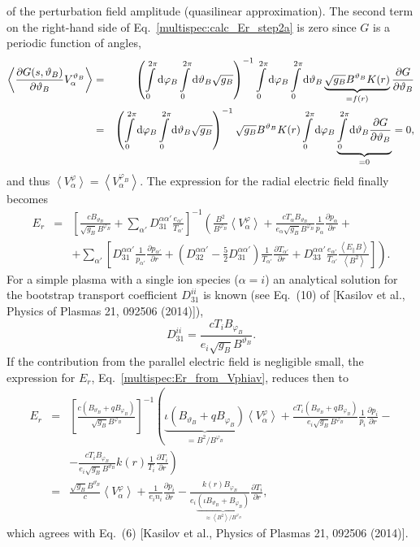 \documentclass[preprint,prb,aps]{revtex4-1}
\newcommand{\be}[1]{\begin{equation} \label{#1}}
\newcommand{\ee}{\end{equation}}
\newcommand{\bea}[1]{\begin{eqnarray} \label{#1}}
\newcommand{\eea}{\end{eqnarray}}
\newcommand{\non}{\nonumber\\}
\newcommand{\difp}[2]{\frac{\partial #1}{\partial #2}}
\newcommand{\rd}{{\rm d}}
\newcommand{\ph}{{\varphi}}
\newcommand{\tht}{\vartheta}
\begin{document}
of the perturbation field amplitude (quasilinear approximation).
The second term on the right-hand side of Eq.~\eqref{multispec:calc_Er_step2a} is zero
since $G$ is a periodic function of angles,
\bea{multispec:calc_Er_step2b}
\left\langle \difp{G(s,\tht_B)}{\tht_B} V_\alpha^{\tht_B} \right\rangle
&=&
\left(\int\limits_{0}^{2\pi} \rd\ph_B \int\limits_{0}^{2\pi} \rd\tht_B \sqrt{g_B}\right)^{-1}
\int\limits_{0}^{2\pi} \rd\ph_B \int\limits_{0}^{2\pi} \rd\tht_B
\underbrace{\sqrt{g_B} B^{\tht_B} K(r)}_{= f(r)} \difp{G}{\tht_B} \non
&=&
\left(\int\limits_{0}^{2\pi} \rd\ph_B \int\limits_{0}^{2\pi} \rd\tht_B \sqrt{g_B}\right)^{-1}
\sqrt{g_B} B^{\tht_B} K(r) \int\limits_{0}^{2\pi} \rd\ph_B
\underbrace{\int\limits_{0}^{2\pi} \rd\tht_B \difp{G}{\tht_B}}_{= 0} = 0,
\eea
and thus $\left\langle V_\alpha^{\ph} \right\rangle = \left\langle V_\alpha^{\ph_B} \right\rangle$.
The expression for the radial electric field finally becomes
\bea{multispec:Er_from_Vphiav}
E_r
&=&
\left[
\frac{c B_{\tht_B}}{\sqrt{g_B} B^{\ph_B}} +
\sum\limits_{\alpha'} D_{31}^{\alpha \alpha'} \frac{e_{\alpha'}}{T_{\alpha'}}
\right]^{-1}
\left(
\frac{B^2}{B^{\ph_B}} \left\langle V_\alpha^{\ph} \right\rangle +
\frac{c T_\alpha B_{\tht_B}}{e_\alpha \sqrt{g_B} B^{\ph_B}}
\frac{1}{p_\alpha} \difp{p_\alpha}{r} \right. +{} \non
& & +{} \left.
\sum\limits_{\alpha'} \left[
D_{31}^{\alpha \alpha'} \frac{1}{p_{\alpha'}}\difp{p_{\alpha'}}{r} +
\left( D_{32}^{\alpha \alpha'} - \frac{5}{2} D_{31}^{\alpha \alpha'}\right)
\frac{1}{T_{\alpha'}}\difp{T_{\alpha'}}{r} +
D_{33}^{\alpha \alpha'} \frac{e_{\alpha'}}{T_{\alpha'}}
\frac{\left\langle E_{\parallel} B  \right\rangle }{\left\langle B^2 \right\rangle}
\right]
\right).
\eea
For a simple plasma with a single ion species ($\alpha=i$) an analytical solution for
the bootstrap transport coefficient $D_{31}^{ii}$ is known
(see Eq.~(10) of [Kasilov et al., Physics of Plasmas 21, 092506 (2014)]),
\be{multispec:D31_analyt}
D_{31}^{ii} = \frac{c T_i B_{\ph_B}}{e_i \sqrt{g_B} B^{\tht_B}}.
\ee
If the contribution from the parallel electric field is negligible small,
the expression for $E_r$, Eq.~\eqref{multispec:Er_from_Vphiav},
reduces then to
\bea{multispec:Er_from_Vphiav_limit}
E_r
&=&
\left[ \frac{c \left(B_{\tht_B} + q B_{\ph_B} \right)}{\sqrt{g_B} B^{\ph_B}} \right]^{-1}
\left(
\underbrace{\iota \left(B_{\tht_B} + q B_{\ph_B}\right)}_{= B^2 / B^{\ph_B}}
\left\langle V_\alpha^{\ph} \right\rangle +
\frac{c T_i \left(B_{\tht_B} + q B_{\ph_B} \right)}{e_i \sqrt{g_B} B^{\ph_B}}
\frac{1}{p_i}\difp{p_i}{r} \right. -{} \non
& & -{}
\left.
\frac{c T_i B_{\ph_B}}{e_i \sqrt{g_B} B^{\tht_B}} k(r) \frac{1}{T_i}\difp{T_i}{r}
\right) \non
&=&
\frac{\sqrt{g_B} B^{\tht_B}}{c} \left\langle V_\alpha^{\ph} \right\rangle +
\frac{1}{e_i n_i} \difp{p_i}{r} - \frac{k(r) B_{\ph_B}}
{e_i \underbrace{\left(\iota B_{\tht_B} + B_{\ph_B}\right)}_{\approx \left\langle B^2 \right\rangle / B^{\ph_B}}}
\difp{T_i}{r},
\eea
which agrees with Eq.~(6) [Kasilov et al., Physics of Plasmas 21, 092506 (2014)].\\
\end{document}
